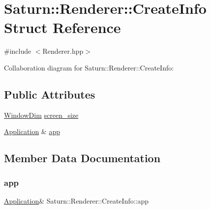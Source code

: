 \hypertarget{struct_saturn_1_1_renderer_1_1_create_info}{}\section{Saturn\+:\+:Renderer\+:\+:Create\+Info Struct Reference}
\label{struct_saturn_1_1_renderer_1_1_create_info}


{\ttfamily \#include $<$Renderer.\+hpp$>$}



Collaboration diagram for Saturn\+:\+:Renderer\+:\+:Create\+Info\+:
\subsection*{Public Attributes}
\begin{DoxyCompactItemize}
\item 
\mbox{\hyperlink{namespace_saturn_a606451fdad804aef3b4f56f6805900f2}{Window\+Dim}} \mbox{\hyperlink{struct_saturn_1_1_renderer_1_1_create_info_a7eceb914b4a55db53f3ab8903ac593c5}{screen\+\_\+size}}
\item 
\mbox{\hyperlink{class_saturn_1_1_application}{Application}} \& \mbox{\hyperlink{struct_saturn_1_1_renderer_1_1_create_info_af88c80596c1cf98e9cb7457089515cc9}{app}}
\end{DoxyCompactItemize}


\subsection{Member Data Documentation}
\mbox{\label{struct_saturn_1_1_renderer_1_1_create_info_af88c80596c1cf98e9cb7457089515cc9}} 
\subsubsection{\texorpdfstring{app}{app}}
{\footnotesize\ttfamily \mbox{\hyperlink{class_saturn_1_1_application}{Application}}\& Saturn\+::\+Renderer\+::\+Create\+Info\+::app}

\mbox{\label{struct_saturn_1_1_renderer_1_1_create_info_a7eceb914b4a55db53f3ab8903ac593c5}} 

